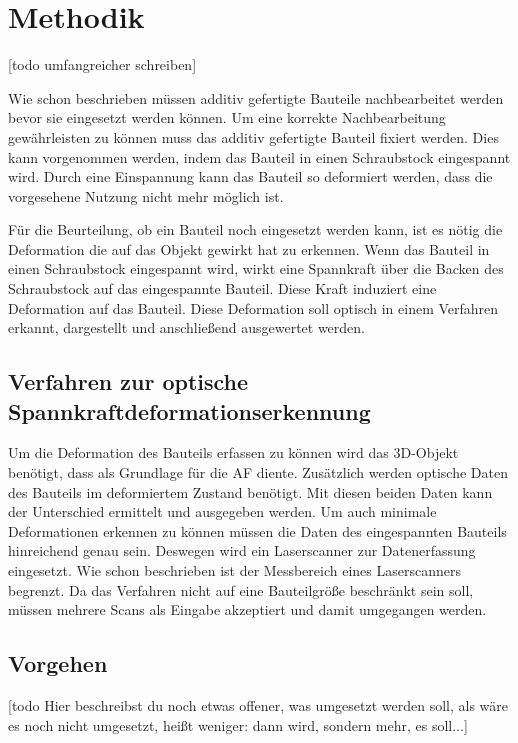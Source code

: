 

\chapter{Methodik}

[todo umfangreicher schreiben]

Wie schon beschrieben müssen additiv gefertigte Bauteile nachbearbeitet werden
bevor sie eingesetzt werden können. 
Um eine korrekte Nachbearbeitung gewährleisten zu können muss das additiv 
gefertigte Bauteil fixiert werden. 
Dies kann vorgenommen werden, indem das Bauteil in einen Schraubstock eingespannt wird.
Durch eine Einspannung kann das Bauteil so deformiert werden, 
dass die vorgesehene Nutzung nicht mehr möglich ist. 

Für die Beurteilung, ob ein Bauteil noch eingesetzt werden kann, ist es nötig die 
Deformation die auf das Objekt gewirkt hat zu erkennen. Wenn das Bauteil in einen 
Schraubstock eingespannt wird, wirkt eine Spannkraft über die Backen des Schraubstock
auf das eingespannte Bauteil.
Diese Kraft induziert eine Deformation auf das Bauteil. 
Diese Deformation soll optisch in einem Verfahren erkannt, dargestellt und 
anschließend ausgewertet werden.

\section{Verfahren zur optische Spannkraftdeformationserkennung}

Um die Deformation des Bauteils erfassen zu können wird das 3D-Objekt benötigt, 
dass als Grundlage für die AF diente. Zusätzlich werden optische Daten des Bauteils 
im deformiertem Zustand benötigt. Mit diesen beiden Daten kann der Unterschied 
ermittelt und ausgegeben werden.
Um auch minimale Deformationen erkennen zu können müssen die Daten des 
eingespannten Bauteils hinreichend genau sein. Deswegen wird ein Laserscanner zur 
Datenerfassung eingesetzt.
Wie schon beschrieben ist der Messbereich eines Laserscanners begrenzt. Da das 
Verfahren nicht auf eine Bauteilgröße beschränkt sein soll, müssen mehrere Scans als 
Eingabe akzeptiert und damit umgegangen werden.

\section{Vorgehen}
[todo Hier beschreibst du noch etwas offener, was umgesetzt werden soll, 
als wäre es noch nicht umgesetzt, heißt weniger: dann wird, sondern mehr, es soll...]

